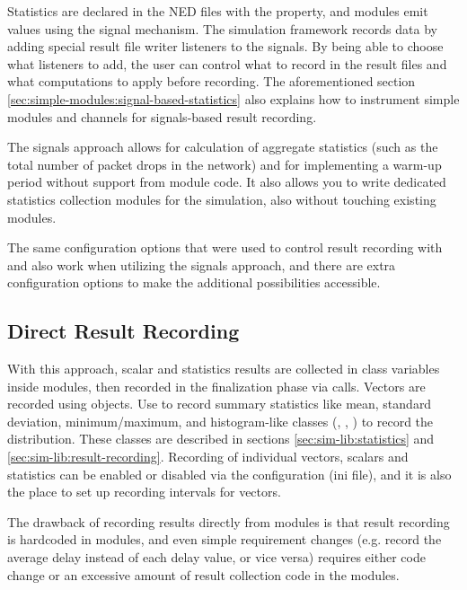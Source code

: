 Statistics are declared in the NED files with the  property,
and modules emit values using the signal mechanism. The simulation framework
records data by adding special result file writer listeners to the signals.
By being able to choose what listeners to add, the user can control what to
record in the result files and what computations to apply before recording.
The aforementioned section \ref{sec:simple-modules:signal-based-statistics}
also explains how to instrument simple modules and channels for signals-based
result recording.

The signals approach allows for calculation of aggregate statistics (such as the
total number of packet drops in the network) and for implementing a warm-up
period without support from module code. It also allows you to write
dedicated statistics collection modules for the simulation, also without
touching existing modules.

The same configuration options that were used to control result recording
with  and  also work when utilizing
the signals approach, and there are extra configuration options to make
the additional possibilities accessible.

\subsection{Direct Result Recording}
\label{sec:ana-sim:direct-result-recording}

With this approach, scalar and statistics results are collected in class
variables inside modules, then recorded in the finalization phase via
 calls. Vectors are recorded using
 objects. Use  to record summary statistics
like mean, standard deviation, minimum/maximum, and histogram-like classes
(, , ) to record the
distribution. These classes are described in sections
\ref{sec:sim-lib:statistics} and \ref{sec:sim-lib:result-recording}.
Recording of individual vectors, scalars and statistics can be enabled or
disabled via the configuration (ini file), and it is also the place to set
up recording intervals for vectors.

The drawback of recording results directly from modules is that result
recording is hardcoded in modules, and even simple requirement changes
(e.g. record the average delay instead of each delay value, or vice versa)
requires either code change or an excessive amount of result collection
code in the modules.



